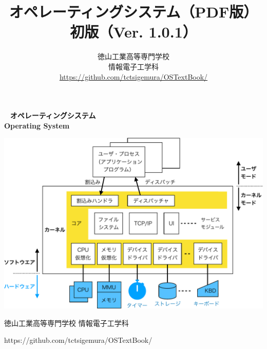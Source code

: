 \documentclass[a4paper,11pt,twocolumn]{ltjsbook}     %
\newif\ifPDF
\newcommand{\pdf}{（PDF版）}
\newcommand{\pdf}{}
\newcommand{\edition}{初版}
\newcommand{\ver}{Ver. 1.0.1}
\begin{document}
\setcounter{page}{0}
\thispagestyle{empty}
\onecolumn
~
\vfill
\vfill
{\noindent
\fontsize{34pt}{50pt}\selectfont\textbf{オペレーティングシステム}\\
\fontsize{34pt}{50pt}\selectfont\textbf{Operating System}
}
\vfill
\vfill
\centerline{
  \includegraphics[scale=0.77]{Fig/osOrganization-crop.pdf}
}
\vfill
\vfill
\centerline{\Large 徳山工業高等専門学校 情報電子工学科}
\centerline{\Large\ttfamily https://github.com/tctsigemura/OSTextBook/}
\vfill

\ifPDF
\newpage
\setcounter{page}{0}
\thispagestyle{empty}
\onecolumn
~
\fi

\frontmatter
\title{オペレーティングシステム{\pdf}\\{\edition}（{\ver}）}
\author{徳山工業高等専門学校\\情報電子工学科\\
\url{https://github.com/tctsigemura/OSTextBook/}}
\date{}
\maketitle
\end{document}
